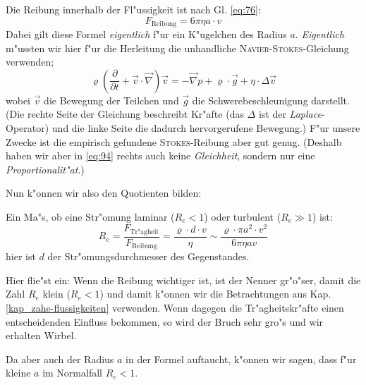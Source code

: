 \begin{description}[\setlabelstyle{\bfseries\slshape}]
\item[Reibung] Die Reibung innerhalb der Fl"ussigkeit ist nach
   Gl. \eqref{eq:76}:
   \begin{equation*}
      F_\text{Reibung} = 6 \pi \eta a \cdot v
   \end{equation*}
   Dabei gilt diese Formel \emph{eigentlich} f"ur ein K"ugelchen des
   Radius $a$. \emph{Eigentlich} m"ussten wir hier f"ur die Herleitung
   die unhandliche
   \textsc{Navier-Stokes}-Gleichung
   verwenden;
   \begin{equation}
      \label{eq:21}
      \varrho \left ( \frac{\partial }{\partial t} + \vec v \cdot \vec
         \nabla \right ) \vec v = -\vec\nabla p + \varrho \cdot \vec g
            + \eta \cdot  \Delta \vec v
   \end{equation}
   wobei $\vec v$ die Bewegung der Teilchen und $\vec g$ die
   Schwerebeschleunigung darstellt. (Die rechte Seite der Gleichung
   beschreibt Kr"afte (das $\Delta$ ist der \emph{Laplace}-Operator)
   und die linke Seite die dadurch hervorgerufene Bewegung.) F"ur
   unsere Zwecke ist die empirisch gefundene \textsc{Stokes}-Reibung
   aber gut genug. (Deshalb haben wir aber in \eqref{eq:94} rechts
   auch keine \emph{Gleichheit}, sondern nur eine \emph{Proportionalit"at}.)
\end{description}
Nun k"onnen wir also den Quotienten bilden:



\begin{Def}
Ein Ma"s, ob eine Str"omung laminar ($R_e < 1$) oder turbulent ($R_e \gg
1$) ist:
\begin{equation}
   \label{eq:94}
R_e =   \frac{F_\text{Tr"agheit}}{F_\text{Reibung}} 
=
    \frac{\varrho \cdot d \cdot v}{\eta} 
\sim
 \frac{\varrho \cdot \pi a^2 \cdot v^2}{6 \pi \eta a v}
\end{equation}
hier ist $d$ der Str"omungsdurchmesser des Gegenstandes.
\end{Def}

Hier flie"st ein: Wenn die Reibung wichtiger ist, ist der Nenner
gr"o"ser, damit die Zahl $R_e$ klein ($R_e < 1$) und damit k"onnen wir
die Betrachtungen aus Kap. \ref{kap_zahe-flussigkeiten}
verwenden. Wenn dagegen die Tr"agheitskr"afte einen entscheidenden
Einfluss bekommen, so wird der Bruch sehr gro"s und wir erhalten
Wirbel.

Da aber auch der Radius $a$ in der Formel auftaucht, k"onnen wir sagen,
dass f"ur kleine $a$ im Normalfall $R_e < 1$.


